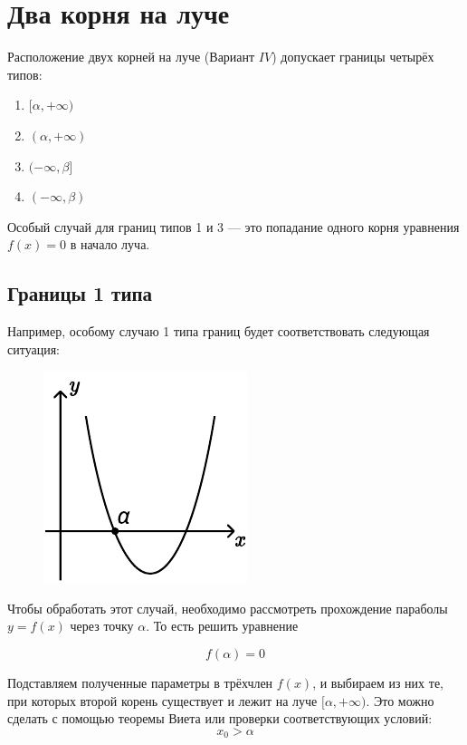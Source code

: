 \section {Два корня на луче}

Расположение двух корней на луче (Вариант $IV$) допускает границы четырёх типов:

\begin {enumerate} [labelindent=\parindent, leftmargin=*]
    \item {$[\alpha, +\infty)$}
    \item {$(\alpha, +\infty)$}
    \item {$(-\infty, \beta]$}
    \item {$(-\infty, \beta)$}
\end {enumerate}

Особый случай для границ типов 1 и 3 --- это попадание одного корня уравнения $f(x)=0$ в начало 
луча.

\subsection {Границы 1 типа}

Например, особому случаю 1 типа границ будет соответствовать следующая ситуация:

\begin {figure} [h]
    \begin {minipage} [t] {\linewidth}
        \centering
        \includegraphics [width=0.3\linewidth] {image/image_10.pdf}
    \end {minipage}
\end {figure}

Чтобы обработать этот случай, необходимо рассмотреть прохождение параболы $y = f(x)$
через точку $\alpha$. То есть решить уравнение

$$ f(\alpha) = 0 $$

Подставляем полученные параметры в трёхчлен $f(x)$, и выбираем из них те, при которых второй корень 
существует и лежит на луче $[\alpha, +\infty)$. Это можно
сделать с помощью теоремы Виета или проверки соответствующих условий:
\begin {equation*}
    x_0 > \alpha
\end {equation*}

